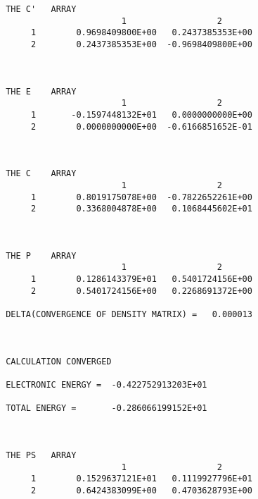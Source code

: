 \begin{verbatim}
 THE C'   ARRAY
                        1                  2
      1        0.9698409800E+00   0.2437385353E+00
      2        0.2437385353E+00  -0.9698409800E+00



 THE E    ARRAY
                        1                  2
      1       -0.1597448132E+01   0.0000000000E+00
      2        0.0000000000E+00  -0.6166851652E-01



 THE C    ARRAY
                        1                  2
      1        0.8019175078E+00  -0.7822652261E+00
      2        0.3368004878E+00   0.1068445602E+01



 THE P    ARRAY
                        1                  2
      1        0.1286143379E+01   0.5401724156E+00
      2        0.5401724156E+00   0.2268691372E+00

 DELTA(CONVERGENCE OF DENSITY MATRIX) =   0.000013



 CALCULATION CONVERGED

 ELECTRONIC ENERGY =  -0.422752913203E+01

 TOTAL ENERGY =       -0.286066199152E+01



 THE PS   ARRAY
                        1                  2
      1        0.1529637121E+01   0.1119927796E+01
      2        0.6424383099E+00   0.4703628793E+00       
\end{verbatim}
  
\newpage
\theendnotes
{}
